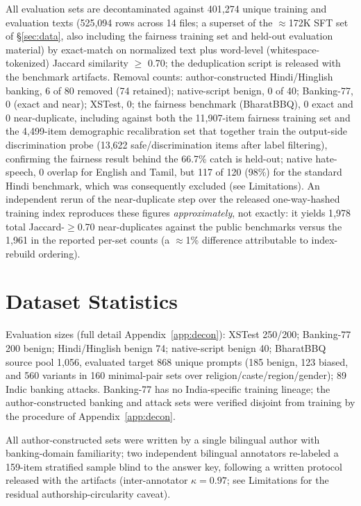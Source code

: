 \documentclass[11pt]{article}
\begin{document}
All evaluation sets are decontaminated against 401{,}274 unique training and evaluation texts (525{,}094 rows across 14 files; a superset of the $\approx$172K SFT set of \S\ref{sec:data}, also including the fairness training set and held-out evaluation material) by exact-match on normalized text plus word-level (whitespace-tokenized) Jaccard similarity $\geq$ 0.70; the deduplication script is released with the benchmark artifacts. Removal counts: author-constructed Hindi/Hinglish banking, 6 of 80 removed (74 retained); native-script benign, 0 of 40; Banking-77, 0 (exact and near); XSTest, 0; the fairness benchmark (BharatBBQ), 0 exact and 0 near-duplicate, including against both the 11,907-item fairness training set and the 4,499-item demographic recalibration set that together train the output-side discrimination probe (13,622 safe/discrimination items after label filtering), confirming the fairness result behind the 66.7\% catch is held-out; native hate-speech, 0 overlap for English and Tamil, but 117 of 120 (98\%) for the standard Hindi benchmark, which was consequently excluded (see Limitations). An independent rerun of the near-duplicate step over the released one-way-hashed training index reproduces these figures \emph{approximately}, not exactly: it yields 1{,}978 total Jaccard-$\geq$0.70 near-duplicates against the public benchmarks versus the 1{,}961 in the reported per-set counts (a $\approx$1\% difference attributable to index-rebuild ordering).

\section{Dataset Statistics}
\label{app:stats}

Evaluation sizes (full detail Appendix~\ref{app:decon}): XSTest 250/200; Banking-77 200 benign; Hindi/Hinglish benign 74; native-script benign 40; BharatBBQ source pool 1,056, evaluated target 868 unique prompts (185 benign, 123 biased, and 560 variants in 160 minimal-pair sets over religion/caste/region/gender); 89 Indic banking attacks.  Banking-77 has no India-specific training lineage; the author-constructed banking and attack sets were verified disjoint from training by the procedure of Appendix~\ref{app:decon}.


All author-constructed sets were written by a single bilingual author with banking-domain familiarity; two independent bilingual annotators re-labeled a 159-item stratified sample blind to the answer key, following a written protocol released with the artifacts (inter-annotator $\kappa=0.97$; see Limitations for the residual authorship-circularity caveat).
\end{document}
